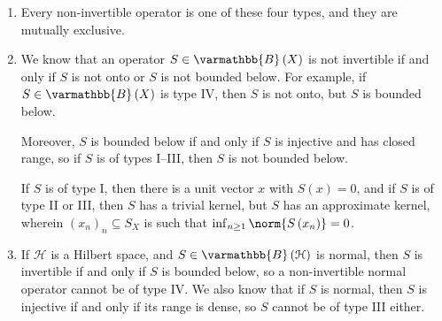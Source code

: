 \documentclass[10pt]{mypackage}
\renewcommand*{\mathbb}[1]{\varmathbb{#1}}
\newcommand{\B}{\mathbb{B}}
\begin{document}
\begin{remark}\hfill
  \begin{enumerate}[(1)]
    \item Every non-invertible operator is one of these four types, and they are mutually exclusive.
    \item We know that an operator $S\in \B\left(X\right)$ is not invertible if and only if $S$ is not onto or $S$ is not bounded below. For example, if $S\in \B\left(X\right)$ is type IV, then $S$ is not onto, but $S$ is bounded below.\newline

      Moreover, $S$ is bounded below if and only if $S$ is injective and has closed range, so if $S$ is of types I--III, then $S$ is not bounded below.\newline

      If $S$ is of type I, then there is a unit vector $x$ with $S\left(x\right) = 0$, and if $S$ is of type II or III, then $S$ has a trivial kernel, but $S$ has an approximate kernel, wherein $\left(x_n\right)_n\subseteq S_X$ is such that $\inf_{n\geq 1}\norm{S\left(x_n\right)} = 0$.
    \item If $\mathcal{H}$ is a Hilbert space, and $S\in \B\left(\mathcal{H}\right)$ is normal, then $S$ is invertible if and only if $S$ is bounded below, so a non-invertible normal operator cannot be of type IV. We also know that if $S$ is normal, then $S$ is injective if and only if its range is dense, so $S$ cannot be of type III either.
  \end{enumerate}
\end{remark}
\end{document}
